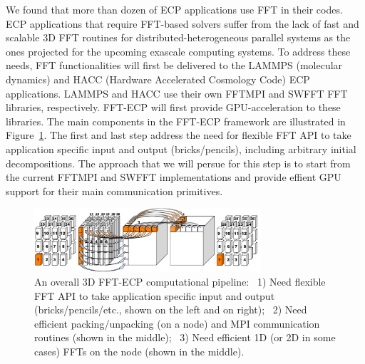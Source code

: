 We found that more than dozen of ECP applications use FFT in their codes.
ECP applications that require FFT-based solvers suffer from the lack of 
fast and scalable 3D FFT routines for distributed-heterogeneous parallel 
systems as the ones projected for the upcoming exascale computing systems. 
To address these needs, FFT functionalities will first be delivered 
to the LAMMPS (molecular dynamics) and HACC (Hardware Accelerated
Cosmology Code) ECP applications. 
LAMMPS and HACC use their own FFTMPI and SWFFT FFT libraries, respectively.
FFT-ECP will first provide GPU-acceleration to these libraries.
The main components in the FFT-ECP framework are illustrated in 
Figure~\ref{fig:fft-ecp-pipeline}. The first and last step address the need 
for flexible FFT API to take application specific input and output (bricks/pencils), 
including arbitrary initial decompositions. The approach that we will persue for 
this step is to start from the current FFTMPI and SWFFT implementations and 
provide effient GPU support for their main communication primitives. 

\begin{figure}[htb]
    \centering
    \includegraphics[width=0.75\textwidth]{projects/2.3.3-MathLibs/2.3.3.13-CLOVER/ffttransormations}
    \caption{\label{fig:fft-ecp-pipeline}
    An overall 3D FFT-ECP computational pipeline:~
      1) Need flexible FFT API to take application specific input and output
         (bricks/pencils/etc., shown on the left and on right);~
      2) Need efficient packing/unpacking (on a node) and MPI communication
         routines (shown in the middle);~
      3) Need efficient 1D (or 2D in some cases) FFTs on the node (shown in the middle).}
\end{figure}

